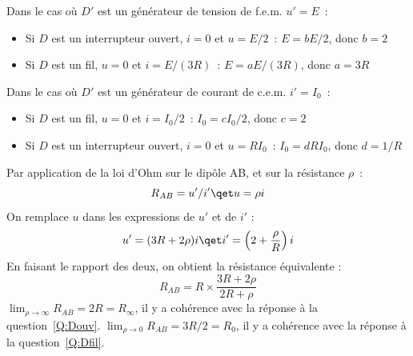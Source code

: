 \documentclass[a4paper, 10pt, garamond, oneside]{book}
\begin{document}
{	\begin{enumerate}
     Dans le cas où $D'$ est un générateur de tension de f.e.m. $u'=E$~:
		      \begin{itemize}
			      \item Si $D$ est un interrupteur ouvert, $i=0$ et $u=E/2$~:
			            $E=bE/2$, donc $\boxed{b=2}$
			      \item Si $D$ est un fil, $u=0$ et $i=E/(3R)$~: $E=aE/(3R)$, donc
			            $\boxed{a=3R}$
		      \end{itemize}
		      Dans le cas où $D'$ est un générateur de courant de c.e.m. $i'=I_0$~:
		      \begin{itemize}
			      \item Si $D$ est un fil, $u=0$ et $i=I_0/2$~: $I_0=cI_0/2$,
			            donc $\boxed{c=2}$
			      \item Si $D$ est un interrupteur ouvert, $i=0$ et $u=RI_0$~:
			            $I_0=dRI_0$, donc $\boxed{d=1/R}$
		      \end{itemize}
     Par application de la loi d'Ohm sur le dipôle AB, et sur la
          résistance
      $\rho$~:
      \[
        R_{AB}=u'/i'
        \qet
        u=\rho i
      \]
      On remplace $u$ dans les expressions de $u'$ et de $i'$ :
      \[
        u'=(3R+2\rho)i
        \qet
        i'=\left (2+\frac{\rho}{R}\right )i
      \]
		  En faisant le rapport des deux, on obtient la résistance équivalente : 
			\[
        \boxed{R_{AB}=R\times \frac{3R+2\rho}{2R+\rho}}
			\]
     $\lim_{\rho\rightarrow \infty }R_{AB}=2R=R_\infty$, il y a cohérence
          avec la réponse à la question~\ref{Q:Douv}.
     $\lim_{\rho\rightarrow 0}R_{AB}=3R/2=R_0$, il y a cohérence avec la
          réponse à la question~\ref{Q:Dfil}.
	\end{enumerate}
}

\newpage

\end{document}
